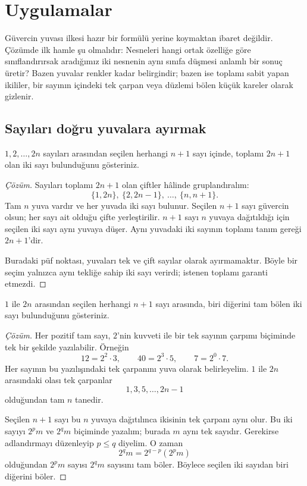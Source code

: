 \section{Uygulamalar}

Güvercin yuvası ilkesi hazır bir formülü yerine koymaktan ibaret değildir. Çözümde ilk hamle şu olmalıdır: Nesneleri hangi ortak özelliğe göre sınıflandırırsak aradığımız iki nesnenin aynı sınıfa düşmesi anlamlı bir sonuç üretir? Bazen yuvalar renkler kadar belirgindir; bazen ise toplamı sabit yapan ikililer, bir sayının içindeki tek çarpan veya düzlemi bölen küçük kareler olarak gizlenir.

\subsection{Sayıları doğru yuvalara ayırmak}

\begin{example}
$1,2,\ldots,2n$ sayıları arasından seçilen herhangi $n+1$ sayı içinde, toplamı $2n+1$ olan iki sayı bulunduğunu gösteriniz.
\end{example}
\begin{proof}[Çözüm]
Sayıları toplamı $2n+1$ olan çiftler hâlinde gruplandıralım:
\[
\{1,2n\},\ \{2,2n-1\},\ \ldots,\ \{n,n+1\}.
\]
Tam $n$ yuva vardır ve her yuvada iki sayı bulunur. Seçilen $n+1$ sayı güvercin olsun; her sayı ait olduğu çifte yerleştirilir. $n+1$ sayı $n$ yuvaya dağıtıldığı için seçilen iki sayı aynı yuvaya düşer. Aynı yuvadaki iki sayının toplamı tanım gereği $2n+1$'dir.

Buradaki püf noktası, yuvaları tek ve çift sayılar olarak ayırmamaktır. Böyle bir seçim yalnızca aynı tekliğe sahip iki sayı verirdi; istenen toplamı garanti etmezdi.
\end{proof}

\begin{example}
$1$ ile $2n$ arasından seçilen herhangi $n+1$ sayı arasında, biri diğerini tam bölen iki sayı bulunduğunu gösteriniz.
\end{example}
\begin{proof}[Çözüm]
Her pozitif tam sayı, $2$'nin kuvveti ile bir tek sayının çarpımı biçiminde tek bir şekilde yazılabilir. Örneğin
\[
12=2^2\cdot3,\qquad 40=2^3\cdot5,\qquad 7=2^0\cdot7.
\]
Her sayının bu yazılışındaki tek çarpanını yuva olarak belirleyelim. $1$ ile $2n$ arasındaki olası tek çarpanlar
\[
1,3,5,\ldots,2n-1
\]
olduğundan tam $n$ tanedir.

Seçilen $n+1$ sayı bu $n$ yuvaya dağıtılınca ikisinin tek çarpanı aynı olur. Bu iki sayıyı $2^pm$ ve $2^qm$ biçiminde yazalım; burada $m$ aynı tek sayıdır. Gerekirse adlandırmayı düzenleyip $p\le q$ diyelim. O zaman
\[
2^qm=2^{q-p}(2^pm)
\]
olduğundan $2^pm$ sayısı $2^qm$ sayısını tam böler. Böylece seçilen iki sayıdan biri diğerini böler.
\end{proof}

